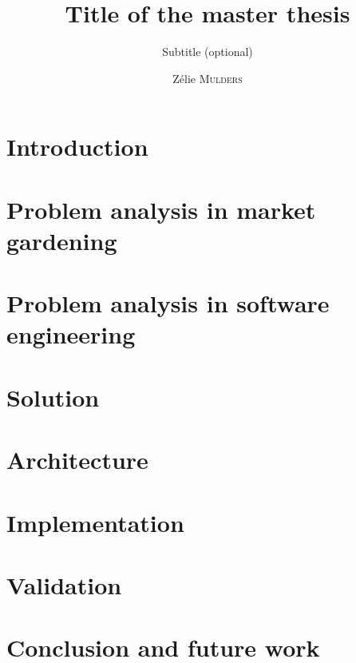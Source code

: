 \documentclass{eplmastersthesis}
\title{Title of the master thesis}	%
\subtitle{Subtitle (optional)}			%
\author{Zélie \textsc{Mulders}}	%
\begin{document}
\maketitle					%

\thispagestyle{empty}		%

\tableofcontents




\chapter{Introduction}
% 


\chapter{Problem analysis in market gardening}


\chapter{Problem analysis in software engineering}


\chapter{Solution}
% 

% 

\chapter{Architecture}
% 

\chapter{Implementation}
% 

\chapter{Validation}
% 

\chapter{Conclusion and future work}
% 



\nocite{*} %



\backcoverpage
\end{document}
